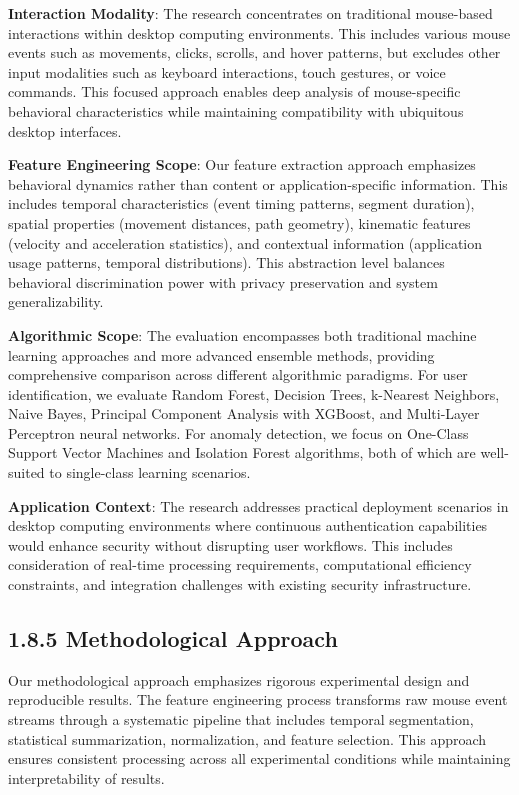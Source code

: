 \documentclass[
  12pt,
  a4paper,
]{report}
\begin{document}
\textbf{Interaction Modality}: The research concentrates on traditional
mouse-based interactions within desktop computing environments. This
includes various mouse events such as movements, clicks, scrolls, and
hover patterns, but excludes other input modalities such as keyboard
interactions, touch gestures, or voice commands. This focused approach
enables deep analysis of mouse-specific behavioral characteristics while
maintaining compatibility with ubiquitous desktop interfaces.

\textbf{Feature Engineering Scope}: Our feature extraction approach
emphasizes behavioral dynamics rather than content or
application-specific information. This includes temporal characteristics
(event timing patterns, segment duration), spatial properties (movement
distances, path geometry), kinematic features (velocity and acceleration
statistics), and contextual information (application usage patterns,
temporal distributions). This abstraction level balances behavioral
discrimination power with privacy preservation and system
generalizability.

\textbf{Algorithmic Scope}: The evaluation encompasses both traditional
machine learning approaches and more advanced ensemble methods,
providing comprehensive comparison across different algorithmic
paradigms. For user identification, we evaluate Random Forest, Decision
Trees, k-Nearest Neighbors, Naive Bayes, Principal Component Analysis
with XGBoost, and Multi-Layer Perceptron neural networks. For anomaly
detection, we focus on One-Class Support Vector Machines and Isolation
Forest algorithms, both of which are well-suited to single-class
learning scenarios.

\textbf{Application Context}: The research addresses practical
deployment scenarios in desktop computing environments where continuous
authentication capabilities would enhance security without disrupting
user workflows. This includes consideration of real-time processing
requirements, computational efficiency constraints, and integration
challenges with existing security infrastructure.

\subsection{1.8.5 Methodological
Approach}\label{methodological-approach}

Our methodological approach emphasizes rigorous experimental design and
reproducible results. The feature engineering process transforms raw
mouse event streams through a systematic pipeline that includes temporal
segmentation, statistical summarization, normalization, and feature
selection. This approach ensures consistent processing across all
experimental conditions while maintaining interpretability of results.
\end{document}
